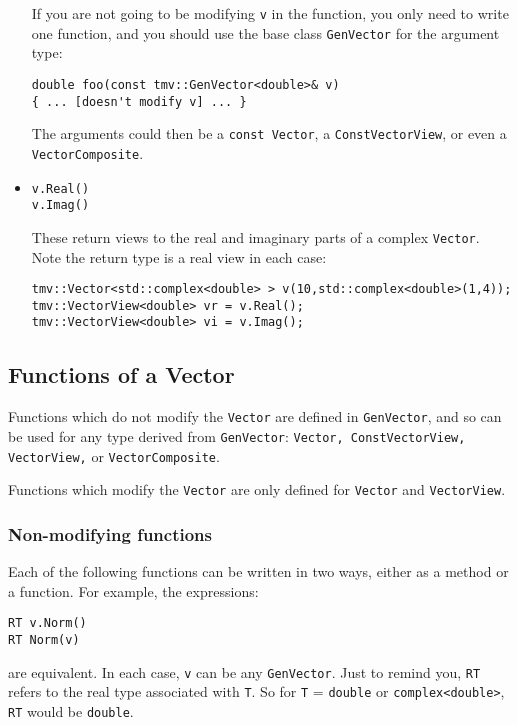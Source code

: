 \documentclass[twoside,letterpaper,11pt]{article}
\renewcommand{\tt}[1]{{\texttt {#1}}}
\begin{document}
\begin{itemize}
If you are not going to be modifying \tt{v} in the function, you only need to
write one function, and you should use the base class \tt{GenVector} 
for the argument type:
\begin{verbatim}
double foo(const tmv::GenVector<double>& v)
{ ... [doesn't modify v] ... }
\end{verbatim}
The arguments could then be a \tt{const Vector}, a \tt{ConstVectorView},
or even a \tt{VectorComposite}.

\item
\begin{verbatim}
v.Real()
v.Imag()
\end{verbatim}
These return views to the real and imaginary parts of a complex \tt{Vector}.
Note the return type is a real view in each case:
\begin{verbatim}
tmv::Vector<std::complex<double> > v(10,std::complex<double>(1,4));
tmv::VectorView<double> vr = v.Real();
tmv::VectorView<double> vi = v.Imag();
\end{verbatim}

\end{itemize}

\subsection{Functions of a Vector }

Functions which do not modify the \tt{Vector} are defined in 
\tt{GenVector}, and so can be used for any type derived from \tt{GenVector}:
\tt{Vector, ConstVectorView, VectorView,} or \tt{VectorComposite}.

Functions which modify the \tt{Vector} are only defined for 
\tt{Vector} and \tt{VectorView}.

\subsubsection{Non-modifying functions}

Each of the following functions can be written in two ways, either as a method or a function.
For example, the expressions:
\begin{verbatim}
RT v.Norm()
RT Norm(v)
\end{verbatim}
are equivalent.  
In each case, \tt{v} can be any \tt{GenVector}.  Just to remind you, \tt{RT} refers to the 
real type associated with \tt{T}.  So for \tt{T} = \tt{double} or \tt{complex<double>},
\tt{RT} would be \tt{double}.
\end{document}
